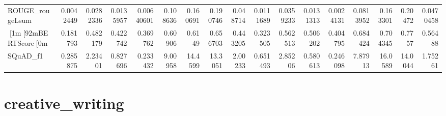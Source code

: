 \begin{tabular}{lrrrrrrrrrrrrrrrr}
 ROUGE_rougeLsum & 0.0042449  & 0.0282336   & 0.0135957  & 0.00640601  & 0.108636   &  0.160691 &  0.190746 & 0.048714    & 0.0111689  & 0.0359233  & 0.0131313   & 0.0024131   & 0.0813952  &  0.163301 &  0.20472  & 0.0470458  \\
 [1m[92mBERTScore[0m       & 0.181793   & 0.482179    & 0.422742   & 0.369762    & 0.60906    &  0.6149   &  0.656703 & 0.443205    & 0.323505   & 0.562513   & 0.506202    & 0.404795    & 0.684424   &  0.704345 &  0.7757   & 0.56488    \\
 SQuAD_f1        & 0.285875   & 2.23401     & 0.827696   & 0.233432    & 9.00958    & 14.4599   & 13.3051   & 2.00233     & 0.651493   & 2.85206    & 0.580613    & 0.246098    & 7.87913    & 16.0589   & 14.0044   & 1.75261    \\
\hline
\end{tabular}\section{creative_writing}
